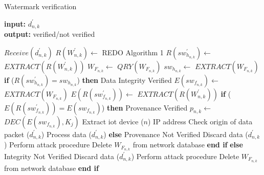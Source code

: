 \documentclass{llncs}
\begin{document}
\begin{enumerate}
    
    \begin{algorithm}[!htbp]
    \caption{Watermark verification}\label{alg2}
    \hspace*{\algorithmicindent} \textbf{input:} $d^{'}_{n,k}$ \\
    \hspace*{\algorithmicindent} \textbf{output:} verified/not verified
    \begin{algorithmic}[1]
    \State $Receive(d^{'}_{n,k})$
    \State $R(W^{'}_{n,k}) \gets $ REDO Algorithm 1 
    \State $R(sw^{'}_{h_{n,k}}) \gets $ $EXTRACT(R(W^{'}_{n,k}))$
    \State $W_{F_{n,k}} \gets $ $QRY(W_{F_{n,k}})$ 
    \State $sw_{h_{n,k}} \gets $ $EXTRACT(W_{F_{n,k}})$
    \State \textbf{if} ($R(sw^{'}_{h_{n,k}}) = sw_{h_{n,k}}$) \textbf{then}
    \State \hspace{10pt} Data Integrity Verified 
    \State \hspace{10pt} $E(sw_{f_{n,k}}) \gets $ $EXTRACT(W_{F_{n,k}})$ 
    \State \hspace{10pt} $E(R(sw^{'}_{f_{n,k}})) \gets $ $EXTRACT(R(W^{'}_{n,k}))$
    \State \hspace{10pt} \textbf{if} ($E(R(sw^{'}_{f_{n,k}})) = E(sw_{f_{n,k}})$) \textbf{then}
    \State \hspace{20pt} Provenance Verified 
    \State \hspace{20pt} $p_{n,k} \gets $ $DEC(E(sw_{f_{n,k}}),K_j)$  
    \State \hspace{20pt} Extract \gls*{iot} device ($n$) IP address
    \State \hspace{20pt} Check origin of data packet ($d^{'}_{n,k}$)
    \State \hspace{20pt} Process data ($d^{'}_{n,k}$)
    \State \hspace{10pt} \textbf{else} 
    \State \hspace{20pt} Provenance Not Verified
    \State \hspace{20pt} Discard data ($d^{'}_{n,k}$)
    \State \hspace{20pt} Perform attack procedure
    \State \hspace{20pt} Delete $W_{F_{n,k}}$ from network database
    \State \hspace{10pt} \textbf{end if}
    \State \textbf{else} 
    \State \hspace{10pt} Integrity Not Verified
    \State \hspace{10pt} Discard data ($d^{'}_{n,k}$)
    \State \hspace{10pt} Perform attack procedure
    \State \hspace{10pt} Delete $W_{F_{n,k}}$ from network database
    \State \textbf{end if}
    \EndProcedure
    \end{algorithmic}
    \end{algorithm}
    

\end{enumerate}
\end{document}
